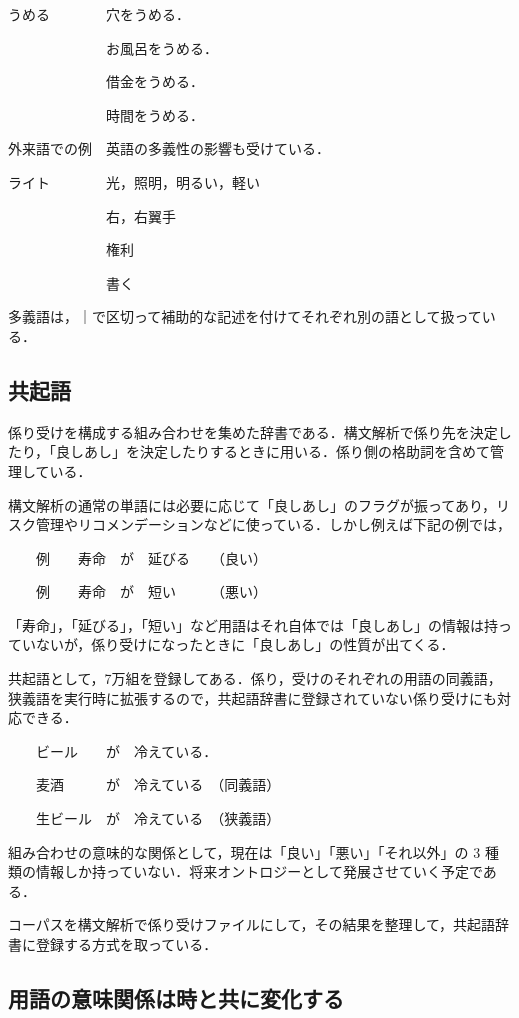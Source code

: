 \documentclass[japanese]{jnlp_1.4}
\begin{document}
うめる　　　　穴をうめる．

　　　　　　　お風呂をうめる．

　　　　　　　借金をうめる．

　　　　　　　時間をうめる．

外来語での例　英語の多義性の影響も受けている．

ライト　　　　光，照明，明るい，軽い

　　　　　　　右，右翼手

　　　　　　　権利 

　　　　　　　書く

多義語は，｜で区切って補助的な記述を付けてそれぞれ別の語として扱っている．


\subsection{共起語}

係り受けを構成する組み合わせを集めた辞書である．構文解析で係り先を決定したり，「良しあし」を決定したりするときに用いる．係り側の格助詞を含めて管理している．

構文解析の通常の単語には必要に応じて「良しあし」のフラグが振ってあり，リスク管理やリコメンデーションなどに使っている．しかし例えば下記の例では，

　　例　　寿命　が　延びる　　（良い）

　　例　　寿命　が　短い　　　（悪い）

「寿命」，「延びる」，「短い」など用語はそれ自体では「良しあし」の情報は持っていないが，係り受けになったときに「良しあし」の性質が出てくる．

共起語として，7万組を登録してある．係り，受けのそれぞれの用語の同義語，狭義語を実行時に拡張するので，共起語辞書に登録されていない係り受けにも対応できる．

　　ビール　　が　冷えている．

　　麦酒　　　が　冷えている　（同義語）

　　生ビール　が　冷えている　（狭義語）

組み合わせの意味的な関係として，現在は「良い」「悪い」「それ以外」の 3 種類の情報しか持っていない．将来オントロジーとして発展させていく予定である．


コーパスを構文解析で係り受けファイルにして，その結果を整理して，共起語辞書に登録する方式を取っている．


\subsection{用語の意味関係は時と共に変化する}
\end{document}
